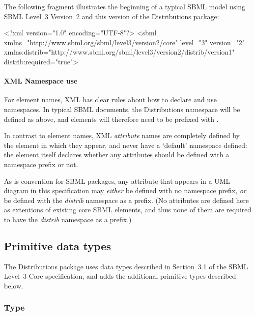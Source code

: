 \documentclass[draftspec]{sbmlpkgspec}
\newcommand{\fixttspace}{\hspace*{1pt}}
\newcommand{\sbmlthreecore}{SBML Level~3 Core\xspace}
\newcommand{\threetwo}{SBML Level~3 Version~2\xspace}
\newcommand{\distrib}{Distributions\xspace}
\begin{document}
The following fragment illustrates the beginning of a typical SBML model using \threetwo and this version of the \distrib package:

\begin{example}
<?xml version="1.0" encoding="UTF-8"?>
<sbml xmlns="http://www.sbml.org/sbml/level3/version2/core" level="3" version="2"
      xmlns:distrib="http://www.sbml.org/sbml/level3/version2/distrib/version1"
      distrib:required="true">
\end{example}


\paragraph{XML Namespace use}

For element names, XML has clear rules about how to declare and use namespaces.  In typical SBML documents, the \distrib namespace will be defined as above, and elements will therefore need to be prefixed with .

In contrast to element names, XML \emph{attribute} names are completely defined by the element in which they appear, and never have a `default' namespace defined:  the element itself declares whether any attributes should be defined with a namespace prefix or not.

As is convention for SBML packages, any attribute that appears in a UML diagram in this specification may \emph{either} be defined with no namespace prefix, \emph{or} be defined with the \emph{distrib} namespace as a prefix.  (No attributes are defined here as extentions of existing core SBML elements, and thus none of them are required to have the \emph{distrib} namespace as a prefix.)



\subsection{Primitive data types}
\label{new-primitive-types}

The \distrib package uses data types described in Section~3.1 of the \sbmlthreecore specification, and adds the additional primitive types described below.

\subsubsection{Type \fixttspace{}}
\label{sec:primtype-externalref}
\end{document}
